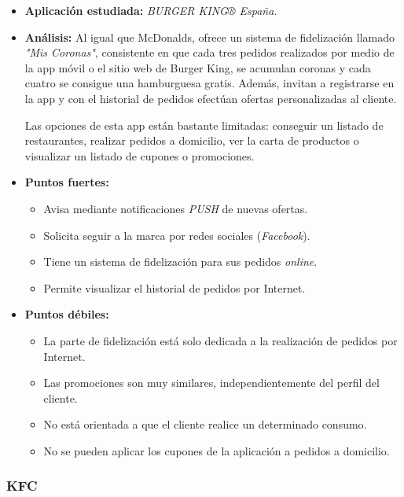 \documentclass[twoside]{report}
\begin{document}
\begin{itemize}
\item \textbf{Aplicación estudiada:} \cite{burgerk} \textit{BURGER KING® España.}
\item \textbf{Análisis:} 
Al igual que McDonalds, ofrece un sistema de fidelización llamado \textit{"Mis Coronas"}, consistente en que cada tres pedidos realizados por medio de la app móvil o el sitio web de Burger King, se acumulan coronas y cada cuatro se consigue una hamburguesa gratis. Además, invitan a registrarse en la app y con el historial de pedidos efectúan ofertas personalizadas al cliente.

Las opciones de esta app están bastante limitadas: conseguir un listado de restaurantes, realizar pedidos a domicilio, ver la carta de productos o visualizar un listado de cupones o promociones.

\item \textbf{Puntos fuertes:}
	\begin{itemize}
	\item Avisa mediante notificaciones \textit{PUSH} de nuevas ofertas.
	\item Solicita seguir a la marca por redes sociales (\textit{Facebook}).
	\item Tiene un sistema de fidelización para sus pedidos \textit{online}.
	\item Permite visualizar el historial de pedidos por Internet.
	\end{itemize}
\item \textbf{Puntos débiles:}
	\begin{itemize}
		\item La parte de fidelización está solo dedicada a la realización de pedidos por Internet.
		\item Las promociones son muy similares, independientemente del perfil del cliente.
		\item No está orientada a que el cliente realice un determinado consumo.
		\item No se pueden aplicar los cupones de la aplicación a pedidos a domicilio.
	\end{itemize}
\end{itemize}

\subsubsection{KFC}
\end{document}
